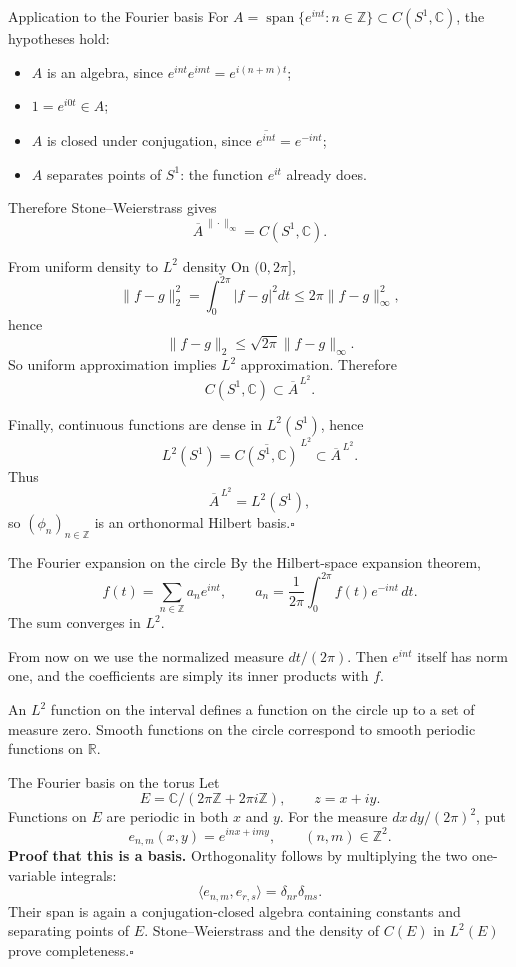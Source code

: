 \documentclass[aspectratio=169,11pt]{beamer}
\newcommand{\C}{\mathbb C}
\newcommand{\R}{\mathbb R}
\newcommand{\Z}{\mathbb Z}
\newcommand{\ee}{e_{n,m}}
\begin{document}
\begin{frame}{Application to the Fourier basis}
For $A=\operatorname{span}\{e^{int}:n\in\Z\}\subset C(S^1,\C)$,
the hypotheses hold:
\begin{itemize}
\item $A$ is an algebra, since $e^{int}e^{imt}=e^{i(n+m)t}$;
\item $1=e^{i0t}\in A$;
\item $A$ is closed under conjugation, since
      $\overline{e^{int}}=e^{-int}$;
\item $A$ separates points of $S^1$: the function $e^{it}$ already does.
\end{itemize}
Therefore Stone--Weierstrass gives
\[
 \overline A^{\,\|\cdot\|_\infty}=C(S^1,\C).
\]
\end{frame}

\begin{frame}{From uniform density to $L^2$ density}
On $(0,2\pi]$,
\[
 \|f-g\|_2^2
 =\int_0^{2\pi}|f-g|^2dt
 \leq 2\pi\|f-g\|_\infty^2,
\]
hence
\[
 \|f-g\|_2\leq\sqrt{2\pi}\|f-g\|_\infty.
\]
So uniform approximation implies $L^2$ approximation. Therefore
\[
 C(S^1,\C)\subset\overline A^{\,L^2}.
\]

Finally, continuous functions are dense in $L^2(S^1)$, hence
\[
 L^2(S^1)=\overline{C(S^1,\C)}^{\,L^2}
 \subset\overline A^{\,L^2}.
\]
Thus
\[
 \boxed{\overline A^{\,L^2}=L^2(S^1),}
\]
so $(\phi_n)_{n\in\Z}$ is an orthonormal Hilbert basis.\hfill$\square$
\end{frame}

\begin{frame}{The Fourier expansion on the circle}
By the Hilbert-space expansion theorem,
\[
 f(t)=\sum_{n\in\Z}a_n e^{int},\qquad
 a_n=\frac1{2\pi}\int_0^{2\pi}f(t)e^{-int}\,dt.
\]
The sum converges in $L^2$.

From now on we use the normalized measure $dt/(2\pi)$.
Then $e^{int}$ itself has norm one, and the coefficients are simply
its inner products with $f$.

An $L^2$ function on the interval defines a function on the circle
up to a set of measure zero. Smooth functions on the circle correspond
to smooth periodic functions on $\R$.
\end{frame}

\begin{frame}{The Fourier basis on the torus}
Let
\[
 E=\C/(2\pi\Z+2\pi i\Z),\qquad z=x+iy.
\]
Functions on $E$ are periodic in both $x$ and $y$.
For the measure $dx\,dy/(2\pi)^2$, put
\[
 \ee(x,y)=e^{inx+imy},\qquad(n,m)\in\Z^2.
\]
\textbf{Proof that this is a basis.} Orthogonality follows by multiplying
the two one-variable integrals:
\[
 \langle e_{n,m},e_{r,s}\rangle=\delta_{nr}\delta_{ms}.
\]
Their span is again a conjugation-closed algebra containing constants
and separating points of $E$. Stone--Weierstrass and the density of
$C(E)$ in $L^2(E)$ prove completeness.\hfill$\square$
\end{frame}
\end{document}
